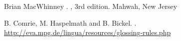 \documentclass[11pt]{article}
\begin{document}
%
%

\begin{thebibliography}{}

Brian MacWhinney
.
, 3rd edition.
\newblock Mahwah, New Jersey

B. Comrie, M. Haspelmath and B. Bickel.
.
\newblock \url{http://eva.mpg.de/lingua/resources/glossing-rules.php}

\end{thebibliography}
\end{document}
